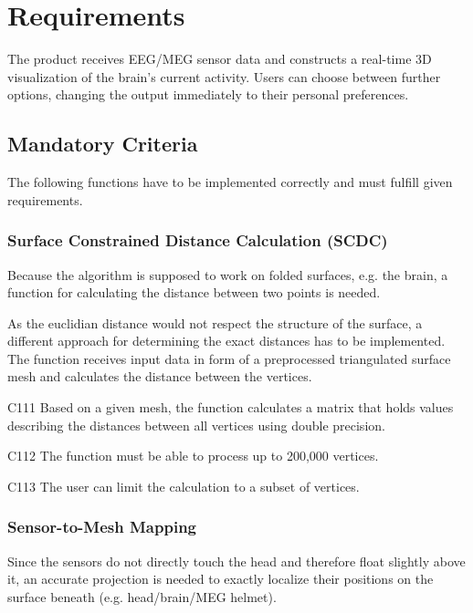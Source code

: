 \section{Requirements} 

	The product receives EEG/MEG sensor data and constructs a real-time 3D visualization of the brain's current activity.
	Users can choose between further options, changing the output immediately to their personal preferences.

\subsection{Mandatory Criteria}

	The following functions have to be implemented correctly and must fulfill given requirements.
		
\subsubsection{Surface Constrained Distance Calculation (SCDC)} \label{scdc}
	
	Because the algorithm is supposed to work on folded surfaces, e.g. the brain, a function for calculating the distance between two points is needed.
	
	As the euclidian distance would not respect the structure of the surface, a different approach for determining the exact 	distances has to be implemented.  
	The function receives input data in form of a preprocessed triangulated surface mesh and calculates the distance between 	the vertices.			
	
	
	\begin{aims}
	
		\item[C111] Based on a given mesh, the function calculates a matrix that holds values describing the distances between 						all vertices using double precision. 
		\item[C112] The function must be able to process up to 200,000 vertices.
		\item[C113] The user can limit the calculation to a subset of vertices. 
	
	\end{aims}

\subsubsection{Sensor-to-Mesh Mapping} \label{projection}

	Since the sensors do not directly touch the head and therefore float slightly above it, an accurate projection is needed 	to exactly localize their positions on the surface beneath (e.g. head/brain/MEG helmet). 
	

